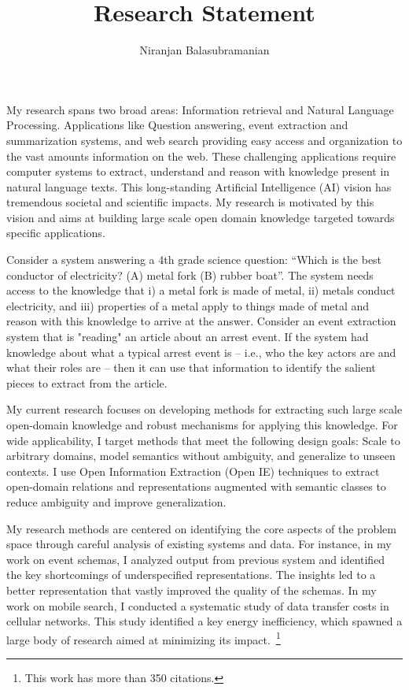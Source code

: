 \documentclass[a4paper,11pt,onecolumn]{article}
\begin{document}

\title{Research Statement}
\author{Niranjan Balasubramanian}
\maketitle

My research spans two broad areas: Information retrieval and Natural Language Processing. Applications like Question answering, event extraction and summarization systems, and web search providing easy access and organization to the vast amounts information on the web. These challenging applications require computer systems to extract, understand and reason with knowledge present in natural language texts. This long-standing Artificial Intelligence (AI) vision has tremendous societal and scientific impacts. My research is motivated by this vision and aims at building large scale open domain knowledge targeted towards specific applications.

Consider a system answering a 4th grade science question:  ``Which is the best conductor of electricity? (A) metal fork (B) rubber boat''. The system needs access to the knowledge that i) a metal fork is made of metal, ii) metals conduct electricity, and iii) properties of a metal apply to things made of metal and reason with this knowledge to arrive at the answer. Consider an event extraction system that is "reading" an article about an arrest event. If the system had knowledge about what a typical arrest event is -- i.e., who the key actors are and what their roles are -- then it can use that information to identify the salient pieces to extract from the article. 

My current research focuses on developing methods for extracting such large scale open-domain knowledge and robust mechanisms for applying this knowledge. For wide applicability, I target methods that meet the following design goals: Scale to arbitrary domains, model semantics without ambiguity, and generalize to unseen contexts. I use Open Information Extraction (Open IE) techniques to extract open-domain relations and representations augmented with semantic classes to reduce ambiguity and improve generalization.

My research methods are centered on identifying the core aspects of the problem space through careful analysis of existing systems and data. For instance, in my work on event schemas, I analyzed output from previous system and identified the key shortcomings of underspecified representations. The insights led to a better representation that vastly improved the quality of the schemas. In my work on mobile search, I conducted a systematic study of data transfer costs in cellular networks. This study identified a key energy inefficiency, which spawned a large body of research aimed at minimizing its impact.~\footnote{This work has more than 350 citations.} 
\end{document}
